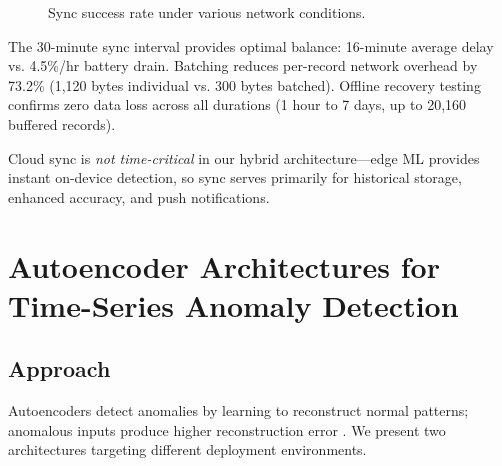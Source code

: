 \documentclass[conference]{IEEEtran}
\begin{document}
\begin{figure}[H]
\centering
{}
\caption{Sync success rate under various network conditions.}
\label{fig:sync_reliability}
\end{figure}

The 30-minute sync interval provides optimal balance: 16-minute average delay vs. 4.5\%/hr battery drain. Batching reduces per-record network overhead by 73.2\% (1,120 bytes individual vs. 300 bytes batched). Offline recovery testing confirms zero data loss across all durations (1 hour to 7 days, up to 20,160 buffered records).

Cloud sync is \textit{not time-critical} in our hybrid architecture---edge ML provides instant on-device detection, so sync serves primarily for historical storage, enhanced accuracy, and push notifications.



\section{Autoencoder Architectures for Time-Series Anomaly Detection}

\subsection{Approach}
Autoencoders detect anomalies by learning to reconstruct normal patterns; anomalous inputs produce higher reconstruction error \cite{ae_anomaly}. We present two architectures targeting different deployment environments.
\end{document}
